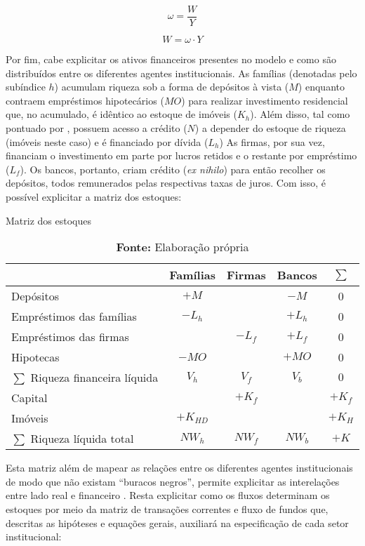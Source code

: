 $$
\omega = \frac{W}{Y}
$$

\begin{equation}
\label{_W}
    W = \omega\cdot Y
\end{equation}

Por fim, cabe explicitar os ativos financeiros presentes no modelo e como são distribuídos entre os diferentes agentes institucionais. As famílias (denotadas pelo subíndice $h$) acumulam riqueza sob a forma de depósitos à vista ($M$) enquanto contraem empréstimos hipotecários ($MO$) para realizar investimento residencial que, no acumulado, é idêntico ao estoque de imóveis ($K_h$). Além disso, tal como pontuado por \textcite{leamer_housing_2007}, possuem acesso a crédito ($N$) a depender do estoque de riqueza (imóveis neste caso) e é financiado por dívida ($L_h$)
As firmas, por sua vez, financiam o investimento em parte por lucros retidos e o restante por empréstimo ($L_f$). Os bancos, portanto, criam crédito (\textit{ex nihilo}) para então recolher os depósitos, todos remunerados pelas respectivas taxas de juros. Com isso, é possível explicitar a matriz dos estoques:


\begin{table}[H]
\centering
\caption{Matriz dos estoques}
\begin{tabular}{lcccc}
\hline
\hline


                          & Famílias      & Firmas        & Bancos  &    $\sum$ \\ \hline

Depósitos & $+M$ & & $-M$ & 0\\
Empréstimos das famílias &$-L_h$&& $+L_h$ & 0\\
Empréstimos das firmas & &$-L_f$& $+L_f$ & 0\\
Hipotecas &$-MO$&  & $+MO$ & 0\\\hline
$\sum$ Riqueza financeira líquida &$V_h$&$V_f$&$V_b$& $0$\\\hline
Capital & &$+K_f$&  & $+K_f$\\
Imóveis &$+K_{HD}$& &   & $+K_{H}$\\\hline
$\sum$ Riqueza líquida total&$NW_h$&$NW_f$&$NW_b$& $+K$\\
\hline
\hline
\end{tabular}%
\caption*{\textbf{Fonte:} Elaboração própria}
\end{table}

Esta matriz além de mapear as relações entre os diferentes agentes institucionais de modo que não existam ``buracos negros'', permite explicitar as interelações entre lado real e financeiro \cite{dos_santos_revisiting_2010}. Resta explicitar como os fluxos determinam os estoques por meio da matriz de transações correntes e fluxo de fundos que, descritas as hipóteses e equações gerais, auxiliará na especificação de cada setor institucional:

